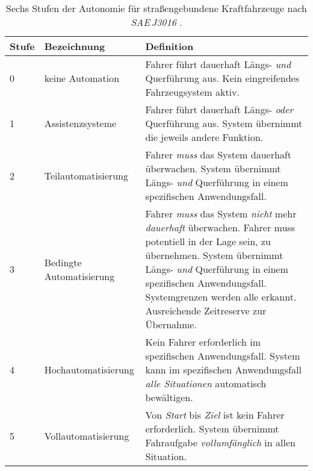 \begin{table}[!htb]
	\centering
	\caption{Sechs Stufen der Autonomie für straßengebundene Kraftfahrzeuge nach \emph{SAE\,J3016} \cite{VerbandderAutomibilindustriee.V..2015}.}
	\renewcommand{\arraystretch}{1.3}
	\begin{tabular}{l  l | p{8.5cm}}
		\toprule
		Stufe & Bezeichnung & Definition \\ 
		\midrule
		0 & keine Automation & Fahrer führt dauerhaft Längs- \emph{und} Querführung aus. Kein eingreifendes Fahrzeugsystem aktiv.\\
		1 & Assistenzsysteme & Fahrer führt dauerhaft Längs- \emph{oder} Querführung aus. System übernimmt die jeweils andere Funktion.\\
		2 & Teilautomatisierung & Fahrer \emph{muss} das System dauerhaft überwachen. System übernimmt Längs- \emph{und} Querführung in einem spezifischen Anwendungsfall\footnotemark.\\
		3 & Bedingte Automatisierung & Fahrer \emph{muss} das System \emph{nicht} mehr \emph{dauerhaft} überwachen. Fahrer muss potentiell in der Lage sein, zu übernehmen. System übernimmt Längs- \emph{und} Querführung in einem spezifischen Anwendungsfall. Systemgrenzen werden alle erkannt. Ausreichende Zeitreserve zur Übernahme.\\
		4 & Hochautomatisierung & Kein Fahrer erforderlich im spezifischen Anwendungsfall. System kann im spezifischen Anwendungsfall \emph{alle Situationen} automatisch bewältigen.\\
		5 & Vollautomatisierung & Von \emph{Start} bis \emph{Ziel} ist kein Fahrer erforderlich. System übernimmt Fahraufgabe \emph{vollumfänglich} in allen Situation.\\
		\bottomrule
	\end{tabular}
	\label{tab:AutonomiestufenSAE}
\end{table}

